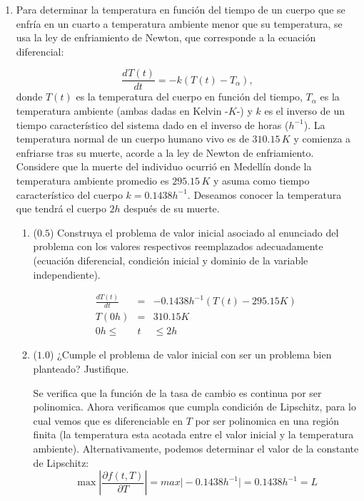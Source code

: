 \documentclass[12pt]{article}
\newcommand{\diff}[3]{\frac{d^{#3} #1}{d#2^{#3}}}
\begin{document}
\vspace{-.5cm}
  \begin{enumerate}[leftmargin=*,widest=9]


    \item Para determinar la temperatura en función del tiempo de un cuerpo que se enfría en un cuarto a temperatura ambiente menor que su temperatura, se usa la ley de enfriamiento de Newton, que corresponde a la ecuación diferencial:

    \[
    \diff{T(t)}{t}{} = -k(T(t) - T_{\alpha}),
    \]
    donde \(T(t)\) es la temperatura del cuerpo en función del tiempo, \(T_{\alpha}\) es la temperatura ambiente (ambas dadas en Kelvin -\(K\)-) y \(k\) es el inverso de un tiempo característico del sistema dado en el inverso de horas (\(h^{-1}\)).
    La temperatura normal de un cuerpo humano vivo es de \(310.15\,K\) y comienza a enfriarse tras su muerte, acorde a la ley de Newton de enfriamiento. Considere que la muerte del individuo ocurrió en Medellín donde la temperatura ambiente promedio es \(295.15\,K\) y asuma como tiempo característico del cuerpo \(k= 0.1438h^{-1}\). Deseamos conocer la temperatura que tendrá el cuerpo \(2h\) después de su muerte.

   \begin{enumerate}[label=\alph*]
    \item (\(0.5\)) Construya el problema de valor inicial asociado al enunciado del problema con los valores respectivos reemplazados adecuadamente (ecuación diferencial, condición inicial y dominio de la variable independiente).



    \begin{eqnarray*}
    \frac{dT(t)}{dt} &=& -0.1438 h^{-1} (T(t) - 295.15K)\\
    T(0h) &=& 310.15K \\
    0h \leq & t & \leq 2h
    \end{eqnarray*}



    \item (\(1.0\)) ¿Cumple el problema de valor inicial con ser un problema bien planteado? Justifique.



    Se verifica que la función de la tasa de cambio es continua por ser polinomica. Ahora verificamos que cumpla condición de Lipschitz, para lo cual vemos que es diferenciable en $T$ por ser polinomica en una región finita (la temperatura esta acotada entre el valor inicial y la temperatura ambiente). Alternativamente, podemos determinar el valor de la constante de Lipschitz:
    \begin{equation*}
    \max \left\vert \frac{\partial f(t, T)}{\partial T} \right\vert = max \vert -0.1438h^{-1}\vert = 0.1438 h^{-1} = L
    \end{equation*}


\end{enumerate}
\end{enumerate}
\end{document}
